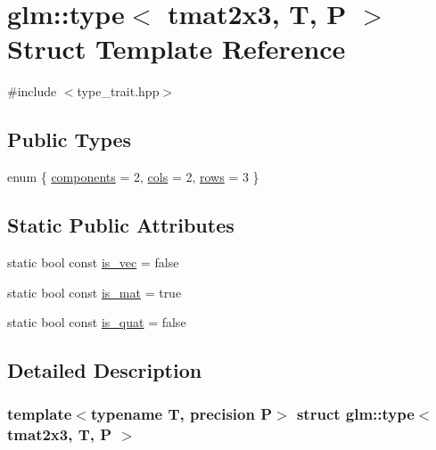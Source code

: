 \hypertarget{structglm_1_1type_3_01tmat2x3_00_01_t_00_01_p_01_4}{}\section{glm\+::type$<$ tmat2x3, T, P $>$ Struct Template Reference}
\label{structglm_1_1type_3_01tmat2x3_00_01_t_00_01_p_01_4}


{\ttfamily \#include $<$type\+\_\+trait.\+hpp$>$}

\subsection*{Public Types}
\begin{DoxyCompactItemize}
\item 
enum \{ \mbox{\hyperlink{structglm_1_1type_3_01tmat2x3_00_01_t_00_01_p_01_4_a4db54e54c9a27fce5d5fde34b6a241e2ad78f8088e63f167c60dab50fdbe5165d}{components}} = 2, 
\mbox{\hyperlink{structglm_1_1type_3_01tmat2x3_00_01_t_00_01_p_01_4_a4db54e54c9a27fce5d5fde34b6a241e2ade7fa3d0e5f3e15d9122eac09513f543}{cols}} = 2, 
\mbox{\hyperlink{structglm_1_1type_3_01tmat2x3_00_01_t_00_01_p_01_4_a4db54e54c9a27fce5d5fde34b6a241e2ac0316076dc7bccadfa0cf36f9875788a}{rows}} = 3
 \}
\end{DoxyCompactItemize}
\subsection*{Static Public Attributes}
\begin{DoxyCompactItemize}
\item 
static bool const \mbox{\hyperlink{structglm_1_1type_3_01tmat2x3_00_01_t_00_01_p_01_4_aaf1b59c556fe102c644d35df40e27dda}{is\+\_\+vec}} = false
\item 
static bool const \mbox{\hyperlink{structglm_1_1type_3_01tmat2x3_00_01_t_00_01_p_01_4_a6ab5d376d2ef7072813e3836fc9ccf95}{is\+\_\+mat}} = true
\item 
static bool const \mbox{\hyperlink{structglm_1_1type_3_01tmat2x3_00_01_t_00_01_p_01_4_a2d2bbd03e889bb34375c236c196af7c4}{is\+\_\+quat}} = false
\end{DoxyCompactItemize}


\subsection{Detailed Description}
\subsubsection*{template$<$typename T, precision P$>$\newline
struct glm\+::type$<$ tmat2x3, T, P $>$}



